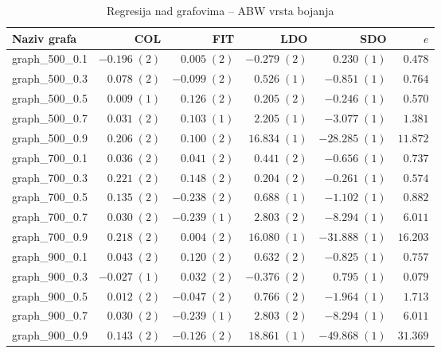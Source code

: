 \documentclass[times, utf8, diplomski, numeric]{fer}
\begin{document}
\begin{table}[htb]
	\caption{Regresija nad grafovima -- ABW vrsta bojanja}
	\label{tbl:regresija-ABW}
	\centering
	\begin{tabular}{|l|r|r|r|r|r|} \hline
	Naziv grafa & COL & FIT & LDO & SDO & $e$ \\ \hline \hline
graph\_500\_0.1 & $ -0.196\; (2) $ & $ 0.005\; (2) $ & $ -0.279\; (2) $ & $ 0.230\; (1) $ & $ 0.478 $\\ \hline
graph\_500\_0.3 & $ 0.078\; (2) $ & $ -0.099\; (2) $ & $ 0.526\; (1) $ & $ -0.851\; (1) $ & $ 0.764 $\\ \hline
graph\_500\_0.5 & $ 0.009\; (1) $ & $ 0.126\; (2) $ & $ 0.205\; (2) $ & $ -0.246\; (1) $ & $ 0.570 $\\ \hline
graph\_500\_0.7 & $ 0.031\; (2) $ & $ 0.103\; (1) $ & $ 2.205\; (1) $ & $ -3.077\; (1) $ & $ 1.381 $\\ \hline
graph\_500\_0.9 & $ 0.206\; (2) $ & $ 0.100\; (2) $ & $ 16.834\; (1) $ & $ -28.285\; (1) $ & $ 11.872 $\\ \hline
graph\_700\_0.1 & $ 0.036\; (2) $ & $ 0.041\; (2) $ & $ 0.441\; (2) $ & $ -0.656\; (1) $ & $ 0.737 $\\ \hline
graph\_700\_0.3 & $ 0.221\; (2) $ & $ 0.148\; (2) $ & $ 0.204\; (2) $ & $ -0.261\; (1) $ & $ 0.574 $\\ \hline
graph\_700\_0.5 & $ 0.135\; (2) $ & $ -0.238\; (2) $ & $ 0.688\; (1) $ & $ -1.102\; (1) $ & $ 0.882 $\\ \hline
graph\_700\_0.7 & $ 0.030\; (2) $ & $ -0.239\; (1) $ & $ 2.803\; (2) $ & $ -8.294\; (1) $ & $ 6.011 $\\ \hline
graph\_700\_0.9 & $ 0.218\; (2) $ & $ 0.004\; (2) $ & $ 16.080\; (1) $ & $ -31.888\; (1) $ & $ 16.203 $\\ \hline
graph\_900\_0.1 & $ 0.043\; (2) $ & $ 0.120\; (2) $ & $ 0.632\; (2) $ & $ -0.825\; (1) $ & $ 0.757 $\\ \hline
graph\_900\_0.3 & $ -0.027\; (1) $ & $ 0.032\; (2) $ & $ -0.376\; (2) $ & $ 0.795\; (1) $ & $ 0.079 $\\ \hline
graph\_900\_0.5 & $ 0.012\; (2) $ & $ -0.047\; (2) $ & $ 0.766\; (2) $ & $ -1.964\; (1) $ & $ 1.713 $\\ \hline
graph\_900\_0.7 & $ 0.030\; (2) $ & $ -0.239\; (1) $ & $ 2.803\; (2) $ & $ -8.294\; (1) $ & $ 6.011 $\\ \hline
graph\_900\_0.9 & $ 0.143\; (2) $ & $ -0.126\; (2) $ & $ 18.861\; (1) $ & $ -49.868\; (1) $ & $ 31.369 $\\ \hline
	\end{tabular}
\end{table} 
\end{document}
